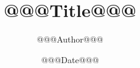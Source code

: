 \documentclass[10pt]{article}
\title{@@@Title@@@}
\author{@@@Author@@@}
\date{@@@Date@@@}
\begin{document}
     \def\appendixpage{\newpage \begin{center}  \Huge\textbf{Annexe}  \end{center}  }
     \def\appendixname{Annexe}%
     \maketitle
\end{document}
